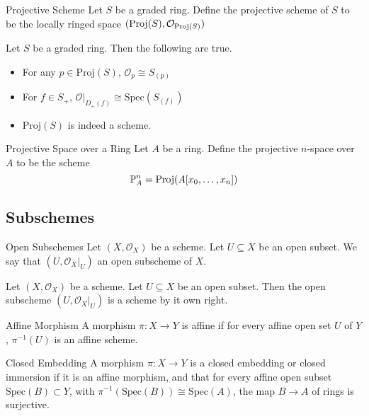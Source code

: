 \documentclass[a4paper]{article}
\begin{document}
\begin{defn}{Projective Scheme}{} Let $S$ be a graded ring. Define the projective scheme of $S$ to be the locally ringed space $(\text{Proj}(S),\mathcal{O}_{\text{Proj}(S)})$
\end{defn}

\begin{prp}{}{} Let $S$ be a graded ring. Then the following are true. 
\begin{itemize}
\item For any $p\in\text{Proj}(S)$, $\mathcal{O}_{p}\cong S_{(p)}$
\item For $f\in S_+$, $\mathcal{O}|_{D_+(f)}\cong\text{Spec}(S_{(f)})$
\item $\text{Proj}(S)$ is indeed a scheme. 
\end{itemize}
\end{prp}

\begin{defn}{Projective Space over a Ring}{} Let $A$ be a ring. Define the projective $n$-space over $A$ to be the scheme $$\mathbb{P}_A^n=\text{Proj}(A[x_0,\dots,x_n])$$
\end{defn}

\subsection{Subschemes}
\begin{defn}{Open Subschemes}{} Let $(X,\mathcal{O}_X)$ be a scheme. Let $U\subseteq X$ be an open subset. We say that $(U,\mathcal{O}_X|_U)$ an open subscheme of $X$. 
\end{defn}

\begin{prp}{}{} Let $(X,\mathcal{O}_X)$ be a scheme. Let $U\subseteq X$ be an open subset. Then the open subscheme $(U,\mathcal{O}_X|_U)$ is a scheme by it own right. 
\end{prp}

\begin{defn}{Affine Morphism}{} A morphism $\pi:X\to Y$ is affine if for every affine open set $U$ of $Y$, $\pi^{-1}(U)$ is an affine scheme. 
\end{defn}

\begin{defn}{Closed Embedding}{} A morphism $\pi:X\to Y$ is a closed embedding or closed immersion if it is an affine morphism, and that for every affine open subset $\text{Spec}(B)\subset Y$, with $\pi^{-1}(\text{Spec}(B))\cong\text{Spec}(A)$, the map $B\to A$ of rings is surjective. 
\end{defn}
\end{document}
